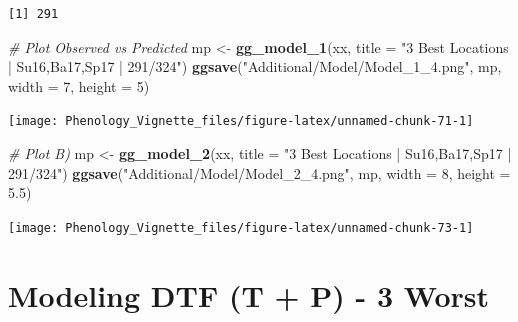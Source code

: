 \documentclass[
]{article}
\newenvironment{Shaded}{\begin{snugshade}}{\end{snugshade}}
\newcommand{\CommentTok}[1]{\textcolor[rgb]{0.56,0.35,0.01}{\textit{#1}}}
\newcommand{\DataTypeTok}[1]{\textcolor[rgb]{0.13,0.29,0.53}{#1}}
\newcommand{\DecValTok}[1]{\textcolor[rgb]{0.00,0.00,0.81}{#1}}
\newcommand{\FloatTok}[1]{\textcolor[rgb]{0.00,0.00,0.81}{#1}}
\newcommand{\KeywordTok}[1]{\textcolor[rgb]{0.13,0.29,0.53}{\textbf{#1}}}
\newcommand{\NormalTok}[1]{#1}
\newcommand{\OperatorTok}[1]{\textcolor[rgb]{0.81,0.36,0.00}{\textbf{#1}}}
\newcommand{\StringTok}[1]{\textcolor[rgb]{0.31,0.60,0.02}{#1}}
\begin{document}
\begin{Shaded}
\end{Shaded}

\begin{verbatim}
[1] 291
\end{verbatim}

\begin{Shaded}
\begin{Highlighting}[]
\CommentTok{# Plot Observed vs Predicted}
\NormalTok{mp <-}\StringTok{ }\KeywordTok{gg_model_1}\NormalTok{(xx, }\DataTypeTok{title =} \StringTok{"3 Best Locations | Su16,Ba17,Sp17 | 291/324"}\NormalTok{)}
\KeywordTok{ggsave}\NormalTok{(}\StringTok{"Additional/Model/Model_1_4.png"}\NormalTok{, mp, }\DataTypeTok{width =} \DecValTok{7}\NormalTok{, }\DataTypeTok{height =} \DecValTok{5}\NormalTok{)}
\end{Highlighting}
\end{Shaded}

\texttt{[image: Phenology\_Vignette\_files/figure-latex/unnamed-chunk-71-1]}

\begin{Shaded}
\begin{Highlighting}[]
\CommentTok{# Plot B)}
\NormalTok{mp <-}\StringTok{ }\KeywordTok{gg_model_2}\NormalTok{(xx, }\DataTypeTok{title =} \StringTok{"3 Best Locations | Su16,Ba17,Sp17 | 291/324"}\NormalTok{)}
\KeywordTok{ggsave}\NormalTok{(}\StringTok{"Additional/Model/Model_2_4.png"}\NormalTok{, mp, }\DataTypeTok{width =} \DecValTok{8}\NormalTok{, }\DataTypeTok{height =} \FloatTok{5.5}\NormalTok{)}
\end{Highlighting}
\end{Shaded}

\texttt{[image: Phenology\_Vignette\_files/figure-latex/unnamed-chunk-73-1]}

\hypertarget{modeling-dtf-t-p---3-worst}{%
\section{Modeling DTF (T + P) - 3
Worst}\label{modeling-dtf-t-p---3-worst}}
\end{document}
